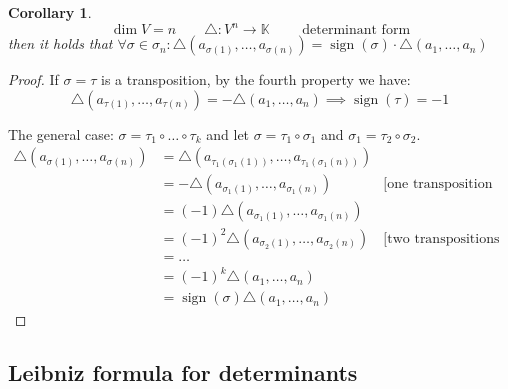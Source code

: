 \documentclass[a4paper]{article}
\newcounter{lecref}[section]
\numberwithin{lecref}{section}
\newtheorem{corollary}[lecref]{Corollary}
\DeclareMathOperator{\sign}{sign}
\begin{document}
\begin{corollary} %
  \label{cor:719}
  \[ \dim V = n \qquad \triangle: V^n \to \mathbb K \qquad \text{ determinant form} \]
  then it holds that $\forall \sigma \in \sigma_n: \triangle(a_{\sigma(1)}, \dots, a_{\sigma(n)}) = \sign(\sigma) \cdot \triangle(a_1, \dots, a_n)$
\end{corollary}

\begin{proof}
  If $\sigma = \tau$ is a transposition, by the fourth property we have:
  \[ \triangle(a_{\tau(1)}, \dots, a_{\tau(n)}) = -\triangle(a_1, \dots, a_n) \implies \sign(\tau) = -1 \]

  The general case: $\sigma = \tau_1 \circ \dots \circ \tau_k$ and let $\sigma = \tau_1 \circ \sigma_1$ and $\sigma_1 = \tau_2 \circ \sigma_2$.
  \begin{align*}
    \triangle(a_{\sigma(1)}, \dots, a_{\sigma(n)}) &= \triangle(a_{\tau_1(\sigma_1(1))}, \dots, a_{\tau_1(\sigma_1(n))}) \\
      &= -\triangle(a_{\sigma_1(1)}, \dots, a_{\sigma_1(n)}) & \text{[one transposition applied]} \\
      &= (-1) \triangle(a_{\sigma_1(1)}, \dots, a_{\sigma_1(n)}) \\
      &= (-1)^2 \triangle(a_{\sigma_2(1)}, \dots, a_{\sigma_2(n)}) & \text{[two transpositions applied]} \\
      &= \dots \\
      &= (-1)^k \triangle (a_1, \dots, a_n) \\
      &= \sign(\sigma) \triangle(a_1, \dots, a_n)
  \end{align*}
\end{proof}

\subsection{Leibniz formula for determinants}
\end{document}
